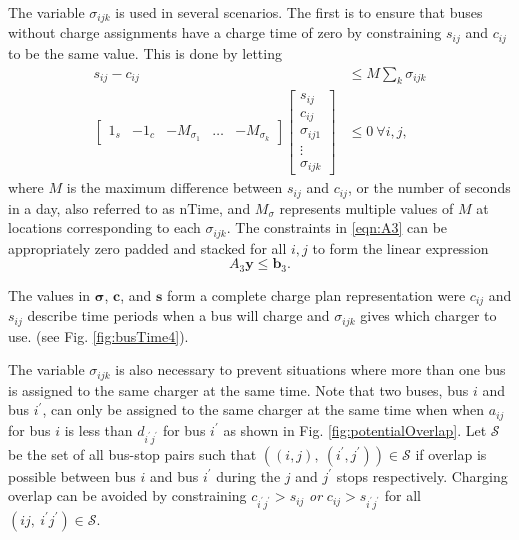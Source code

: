 	The variable $\sigma_{ijk}$ is used in several scenarios. The first is to ensure that buses without charge assignments have a charge time of zero by constraining $s_{ij}$ and $c_{ij}$ to be the same value. This is done by letting
	\begin{equation}\label{eqn:A3}\begin{aligned}
	s_{ij} - c_{ij} &\le M\sum_{k}\sigma_{ijk} \\
		\begin{bmatrix} 1_s & -1_c & -M_{\sigma_1} & \hdots & -M_{\sigma_k} \end{bmatrix}\begin{bmatrix}s_{ij} \\ c_{ij} \\ \sigma_{ij1} \\ \vdots \\ \sigma_{ijk} \end{bmatrix} &\le 0 \ \forall i,j, 
\end{aligned} \end{equation}
	where $M$ is the maximum difference between $s_{ij}$ and $c_{ij}$, or the number of seconds in a day, also referred to as $\text{nTime}$, and $M_\sigma$ represents multiple values of $M$ at locations corresponding to each $\sigma_{ijk}$. The constraints in \eqref{eqn:A3} can be appropriately zero padded and stacked for all $i,j$ to form the linear expression
	\begin{equation} 
		A_3\mathbf{y} \le \mathbf{b}_3.
	\end{equation}
	\par The values in $\boldsymbol{\sigma}$, $\mathbf{c}$, and $\mathbf{s}$ form a complete charge plan representation were $c_{ij}$ and $s_{ij}$ describe time periods when a bus will charge and $\sigma_{ijk}$ gives which charger to use. (see Fig. \ref{fig:busTime4}).

	The variable $\sigma_{ijk}$ is also necessary to prevent situations where more than one bus is assigned to the same charger at the same time. Note that two buses, bus $i$ and bus $i^{'}$, can only be assigned to the same charger at the same time when when $a_{ij}$ for bus $i$ is less than $d_{i^{'}j^{'}}$ for bus $i^{'}$ as shown in Fig. \ref{fig:potentialOverlap}. Let $\mathcal{S}$ be the set of all bus-stop pairs such that $\left ((i,j), \ (i^{'},j^{'}) \right ) \in \mathcal{S}$ if overlap is possible between bus $i$ and bus $i^{'}$ during the $j$ and $j^{'}$ stops respectively. Charging overlap can be avoided by constraining $c_{i^{'}j^{'}} > s_{ij}$ {\it or} $c_{ij} > s_{i^{'}j^{'}}$ for all $\left ( ij, \ i^{'}j^{'}\right ) \in \mathcal{S}$.  
